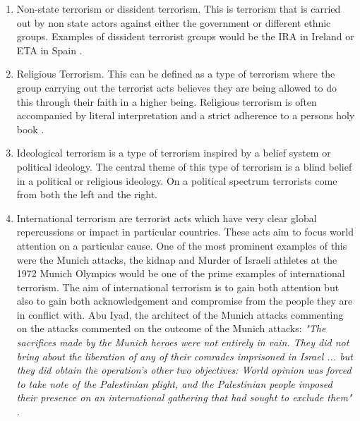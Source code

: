 \begin{enumerate}
\item  Non-state terrorism or dissident terrorism. This is terrorism that is carried out by non state actors against either the government or different ethnic groups. Examples of dissident terrorist groups would be the IRA in Ireland or ETA in Spain \citep{lutz2009successful}.
\item  Religious Terrorism. This can be defined as a type of terrorism where the group carrying out the terrorist acts believes they are being  allowed to do this through their faith in a higher being. Religious terrorism is often accompanied by literal interpretation and a strict adherence to a persons holy book \citep{pratt2015terrorism}.
\item Ideological terrorism is a type of terrorism inspired by a belief system or political ideology. The central theme of this type of terrorism is a blind belief in a political or religious ideology. On a political spectrum terrorists come from both the left and the right.
\item International terrorism are terrorist acts which have very clear global repercussions or impact in particular countries. These acts aim to focus world attention on a particular cause. One of the most prominent examples of this were the Munich attacks, the kidnap and Murder of Israeli athletes at the 1972 Munich Olympics would be one of the prime examples of international terrorism. The aim of international terrorism is to gain both attention but also to gain both acknowledgement and compromise from the people they are in conflict with. Abu Iyad, the architect of the Munich attacks commenting on the attacks commented on the outcome of the Munich attacks: \textit{"The sacrifices made by the Munich heroes were not entirely in vain. They did not bring about the liberation of any of their comrades imprisoned in Israel ... but they did obtain the operation's other two objectives: World opinion was forced to take note of the Palestinian plight, and the Palestinian people imposed their presence on an international gathering that had sought to exclude them"} \citep{iyad1981my}.
\end{enumerate}

